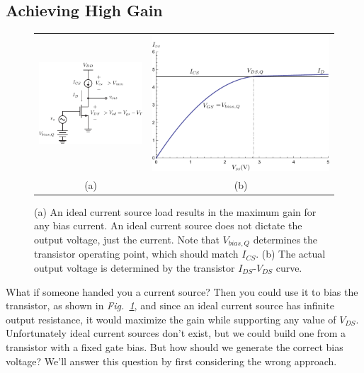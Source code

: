 \subsection{Achieving High Gain}
\begin{figure}[tb]
\centering
\begin{tabular}{cc}
\includegraphics[width=.45\columnwidth]{2cs_current_mirror_load.pdf} &
\includegraphics[width=.45\columnwidth]{mos_output_voltage.pdf}\\
(a) & (b)\\
\end{tabular}
\caption{(a) An ideal current source load results in the maximum gain for any bias current.  An ideal current source does not dictate the output voltage, just the current.  Note that $V_{bias,Q}$ determines the transistor operating point, which should match $I_{CS}$.  (b) The actual output voltage is determined by the transistor $I_{DS}$-$V_{DS}$ curve.}
\label{fig:2cs_current_mirror_load.pdf}
\end{figure}
What if someone handed you a current source?  Then you could use it to bias the transistor, as shown in \emph{Fig.~\ref{fig:2cs_current_mirror_load.pdf}}, and since an ideal current source has infinite output resistance, it would maximize the gain while supporting any value of $V_{DS}$.  Unfortunately ideal current sources don't exist, but we could build one from a transistor with a fixed gate bias.  But how should we generate the correct bias voltage?  We'll answer this question by first considering the wrong approach.
